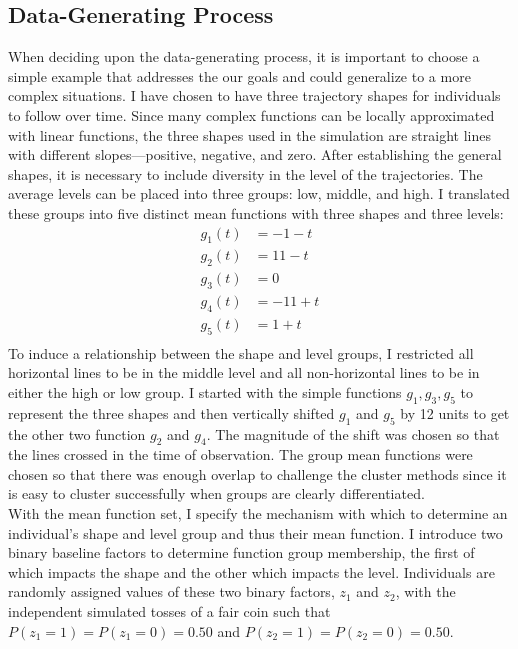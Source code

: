 \documentclass[12pt]{article}
\begin{document}
\subsection{Data-Generating Process}
When deciding upon the data-generating process, it is important to choose a simple example that addresses the our goals and could generalize to a more complex situations. I have chosen to have three trajectory shapes for individuals to follow over time. Since many complex functions can be locally approximated with linear functions, the three shapes used in the simulation are straight lines with different slopes---positive, negative, and zero. After establishing the general shapes, it is necessary to include diversity in the level of the trajectories. The average levels can be placed into three groups: low, middle, and high. I translated these groups into five distinct mean functions with three shapes and three levels:
\begin{align*}
g_{1}(t) &= -1 - t\\
g_{2}(t) &= 11 - t\\
g_{3}(t) &= 0\\
g_{4}(t) &= -11 + t\\
g_{5}(t) &= 1 + t\\
\end{align*} 
To induce a relationship between the shape and level groups, I restricted all horizontal lines to be in the middle level and all non-horizontal lines to be in either the high or low group. I started with the simple functions $g_{1}, g_{3}, g_{5}$ to represent the three shapes and then vertically shifted $g_{1}$ and $g_{5}$ by 12 units to get the other two function $g_{2}$ and $g_{4}$. The magnitude of the shift was chosen so that the lines crossed in the time of observation. The group mean functions were chosen so that there was enough overlap to challenge the cluster methods since it is easy to cluster successfully when groups are clearly differentiated.   \\

With the mean function set, I specify the mechanism with which to determine an individual's shape and level group and thus their mean function. I introduce two binary baseline factors to determine function group membership, the first of which impacts the shape and the other which impacts the level. Individuals are randomly assigned values of these two binary factors, $z_{1}$ and $z_{2}$, with the independent simulated tosses of a fair coin such that $P(z_{1}=1) = P(z_{1}=0) = 0.50$ and $P(z_{2}=1) = P(z_{2}=0)=0.50$. \\
\end{document}
